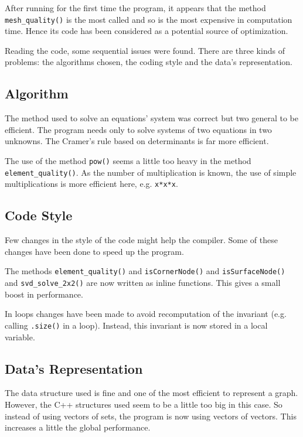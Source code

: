 \documentclass[fleqn,11pt]{SelfArx} %
\begin{document}
After running for the first time the program, it appears that the method \verb+mesh_quality()+ is the most called and so is the most expensive in computation time. Hence its code has been considered as a potential source of optimization.

Reading the code, some sequential issues were found. There are three kinds of problems: the algorithms chosen, the coding style and the data's representation.

\subsection{Algorithm}

The method used to solve an equations' system was correct but two general to be efficient. The program needs only to solve systems of two equations in two unknowns. The Cramer's rule based on determinants is far more efficient.

The use of the method \verb+pow()+ seems a little too heavy in the method \verb+element_quality()+. As the number of multiplication is known, the use of simple multiplications is more efficient here, e.g. \verb+x*x*x+.

\subsection{Code Style}

Few changes in the style of the code might help the compiler. Some of these changes have been done to speed up the program.

The methods \verb+element_quality()+ and \verb+isCornerNode()+ and \verb+isSurfaceNode()+ and \verb+svd_solve_2x2()+ are now written as inline functions. This gives a small boost in performance.

In loops changes have been made to avoid recomputation of the invariant (e.g. calling \verb+.size()+ in a loop). Instead, this invariant is now stored in a local variable.

\subsection{Data's Representation}

The data structure used is fine and one of the most efficient to represent a graph. However, the C++ structures used seem to be a little too big in this case. So instead of using vectors of sets, the program is now using vectors of vectors. This increases a little the global performance.
\end{document}
